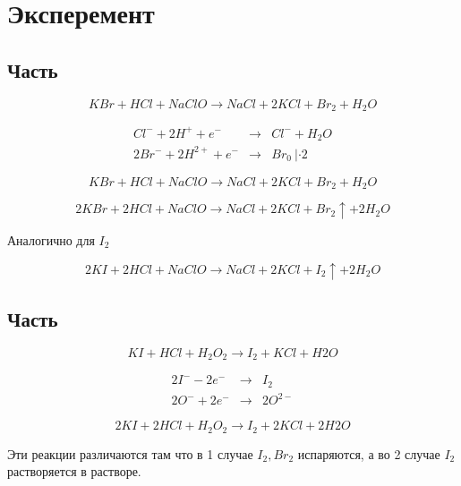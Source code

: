 \section{Эксперемент}
\subsection{Часть}
\begin{equation}
    KBr + HCl + NaClO \to NaCl + 2KCl + Br_2 + H_2O
\end{equation}

\begin{eqnarray}
    Cl^- + 2H^+ + e^- &\to& Cl^- + H_2O \\
    2Br^- + 2H^{2+} + e^- &\to& Br_0 \ | \cdot 2
\end{eqnarray}

\begin{equation}
    KBr + HCl + NaClO \to NaCl + 2KCl + Br_2 + H_2O
\end{equation}

\begin{equation}
    2KBr + 2HCl + NaClO \to NaCl + 2KCl + Br_2\uparrow + 2H_2O
\end{equation}

Аналогично для $I_2$

\begin{equation}
    2KI + 2HCl + NaClO \to NaCl + 2KCl + I_2\uparrow + 2H_2O
\end{equation}

\subsection{Часть}
\begin{equation}
    KI + HCl + H_2O_2 \to  I_2 + KCl + H2O
\end{equation}

\begin{eqnarray}
    2I^- - 2e^- &\to& I_2 \\
    2O^- + 2e^- &\to& 2O^{2-}
\end{eqnarray}

\begin{equation}
    2KI + 2HCl + H_2O_2 \to  I_2 + 2KCl + 2H2O
\end{equation}

Эти реакции различаются там что в 1 случае $I_2, Br_2$ испаряются,
а во 2 случае $I_2$ растворяется в растворе.




